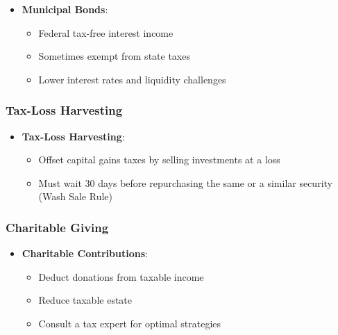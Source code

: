 \documentclass[
]{book}
\providecommand{\tightlist}{%
  \setlength{\itemsep}{0pt}\setlength{\parskip}{0pt}}
\begin{document}
\begin{itemize}
\tightlist
\item
  \textbf{Municipal Bonds}:

  \begin{itemize}
  \tightlist
  \item
    Federal tax-free interest income
  \item
    Sometimes exempt from state taxes
  \item
    Lower interest rates and liquidity challenges
  \end{itemize}
\end{itemize}

\hypertarget{tax-loss-harvesting}{%
\subsubsection{Tax-Loss Harvesting}\label{tax-loss-harvesting}}

\begin{itemize}
\tightlist
\item
  \textbf{Tax-Loss Harvesting}:

  \begin{itemize}
  \tightlist
  \item
    Offset capital gains taxes by selling investments at a loss
  \item
    Must wait 30 days before repurchasing the same or a similar security
    (Wash Sale Rule)
  \end{itemize}
\end{itemize}

\hypertarget{charitable-giving}{%
\subsubsection{Charitable Giving}\label{charitable-giving}}

\begin{itemize}
\tightlist
\item
  \textbf{Charitable Contributions}:

  \begin{itemize}
  \tightlist
  \item
    Deduct donations from taxable income
  \item
    Reduce taxable estate
  \item
    Consult a tax expert for optimal strategies
  \end{itemize}
\end{itemize}
\end{document}
